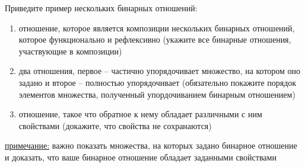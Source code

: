 \question
Приведите  пример  нескольких бинарных отношений:
\begin{enumerate}
	\renewcommand{\labelenumi}{\alph{enumi})}
	\item отношение, которое является композиции нескольких бинарных отношений,  которое  функционально и рефлексивно (укажите все бинарные отношения, участвующие в композиции)
	\item два отношения, первое -- частично упорядочивает множество, на котором оно задано и второе -- полностью упорядочивает (обязательно покажите порядок элементов множества, полученный упордочиванием бинарным отношением)
	\item отношение, такое что  обратное к нему  обладает различными с ним свойствами (докажите, что свойства не сохранаются)
\end{enumerate}

\underline{примечание:} важно показать  множества, на которых задано бинарное отношение и доказать, что ваше бинарное отношение обладает заданными свойствами
